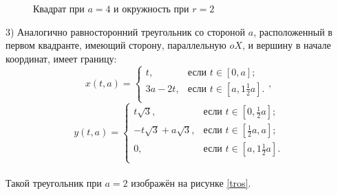 \documentclass[a4paper]{article}
\begin{document}
        \begin{figure}[h!]
          \noindent{}
          \caption{Квадрат при $a=4$ и окружность при $r=2$}
          \label{kvci}
        \end{figure}

  3) Аналогично равносторонний треугольник со стороной $a$, расположенный в первом квадранте, имеющий сторону, параллельную $oX$, и вершину в начале координат, имеет границу:
        \[
          x(t,a) =
          \begin{cases}
            t,     & \text{если $t \in [0,a]$;}             \\
            3a-2t, & \text{если $t \in [a,1\frac{1}{2}a]$.} \\
          \end{cases},
        \]
        \[y(t,a) =
          \begin{cases}
            t \sqrt{3},            & \text{если $t \in [0,\frac{1}{2}a]$;}  \\
            -t \sqrt{3}+a\sqrt{3}, & \text{если $t \in [\frac{1}{2}a,a]$;}  \\
            0,                     & \text{если $t \in [a,1\frac{1}{2}a]$.} \\
          \end{cases}
        \]
        \\
        Такой треугольник при $a=2$ изображён на рисунке \ref{tros}.
\end{document}
